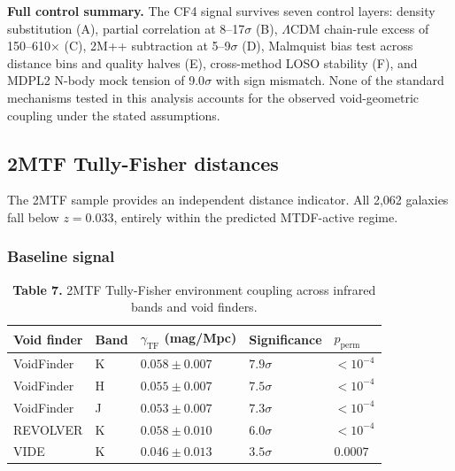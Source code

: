 \documentclass[11pt,a4paper]{article}
\begin{document}
\begin{mdframed}[linecolor=accent,linewidth=0.5pt,backgroundcolor=callout-bg,leftline=true,rightline=true,topline=true,bottomline=true,innerleftmargin=8pt,innerrightmargin=8pt,innertopmargin=6pt,innerbottommargin=6pt]
\textbf{Full control summary.} The CF4 signal survives seven control layers: density substitution (A), partial correlation at 8--17\(\sigma\) (B), \(\Lambda\)CDM chain-rule excess of 150--610\(\times\) (C), 2M++ subtraction at 5--9\(\sigma\) (D), Malmquist bias test across distance bins and quality halves (E), cross-method LOSO stability (F), and MDPL2 N-body mock tension of 9.0\(\sigma\) with sign mismatch. None of the standard mechanisms tested in this analysis accounts for the observed void-geometric coupling under the stated assumptions.
\end{mdframed}

\subsection{2MTF Tully-Fisher distances}
The 2MTF sample provides an independent distance indicator. All 2,062 galaxies fall below \(z = 0.033\), entirely within the predicted MTDF-active regime.

\subsubsection{Baseline signal}
\begin{table}[H]
\centering
\footnotesize
\caption{\textbf{Table 7.} 2MTF Tully-Fisher environment coupling across infrared bands and void finders.}
\begin{tabularx}{\linewidth}{l>{\RaggedRight\arraybackslash}X>{\RaggedRight\arraybackslash}X>{\RaggedRight\arraybackslash}X>{\RaggedRight\arraybackslash}X}
\toprule
\textbf{Void finder} & \textbf{Band} & \textbf{\(\gamma_\mathrm{TF}\) (mag/\allowbreak{}Mpc)} & \textbf{Significance} & \textbf{\(p_\mathrm{perm}\)} \tabularnewline
\midrule
VoidFinder & K & \(0.058 \pm 0.007\) & \(7.9\sigma\) & \(<10^{-4}\) \tabularnewline
VoidFinder & H & \(0.055 \pm 0.007\) & \(7.5\sigma\) & \(<10^{-4}\) \tabularnewline
VoidFinder & J & \(0.053 \pm 0.007\) & \(7.3\sigma\) & \(<10^{-4}\) \tabularnewline
REVOLVER & K & \(0.058 \pm 0.010\) & \(6.0\sigma\) & \(<10^{-4}\) \tabularnewline
VIDE & K & \(0.046 \pm 0.013\) & \(3.5\sigma\) & \(0.0007\) \tabularnewline
\bottomrule
\end{tabularx}
\end{table}
\end{document}
